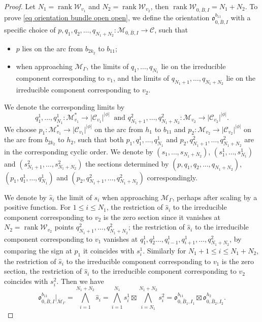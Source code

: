 \documentclass[11pt,a4paper]{article}
\theoremstyle{definition}
\theoremstyle{remark}
\numberwithin{equation}{section}
\def\Mbar{{\overline{\mathcal M}}}
\begin{document}
\begin{proof}
    
    Let $N_1=\operatorname{rank} \mathcal W_{v_1}$ and $N_2=\operatorname{rank} \mathcal W_{v_2}$, then $\operatorname{rank} \mathcal W_{0,\bar{B},I}=N_1+N_2$. To prove \eqref{eq orientation bundle open open}, we define the orientation $\mathfrak{o}^{b_{11}}_{0,\bar B,I}$ with a specific choice of $p,q_1,q_2,\dots,q_{N_1+N_2}\colon \mathcal M_{0,\bar B,I}\to \mathcal C$, such that 
    \begin{itemize}
        \item $p$ lies on the arc from $b_{2k_2}$ to $b_{11}$;
        \item when approaching $\mathcal M_\Gamma$, the limits of $q_1,\dots,q_{N_1}$ lie on the irreducible component corresponding to $v_1$, and  the limits of $q_{N_1+1},\dots,q_{N_1+N_2}$ lie on the irreducible component corresponding to $v_2$.
    \end{itemize}  
    We denote the corresponding limits by \[q^1_1,\dots,q^1_{N_1}\colon \mathcal M^*_{v_1} \to \lvert \mathcal C_{v_1} \rvert^{\lvert \phi\rvert}~\text{ and  }q^2_{N_1+1},\dots,q^2_{N_1+N_2}\colon \mathcal M_{v_2} \to \lvert \mathcal C_{v_2} \rvert^{\lvert \phi\rvert}.\] We choose $p_1\colon \mathcal M^*_{v_1} \to \lvert \mathcal C_{v_1} \rvert^{\lvert \phi\rvert}$ on the arc from $h_1$ to $b_{11}$ and $p_2\colon \mathcal M_{v_2} \to \lvert \mathcal C_{v_2} \rvert^{\lvert \phi\rvert}$ on the arc from $b_{2k_2}$ to $h_2$, such that both $p_1,q^1_1,\dots,q^1_{N_1}$ and $p_2,q^2_{N_1+1},\dots,q^2_{N_1+N_2}$ are in the corresponding cyclic order. We denote by $(s_1,\dots,s_{N_1+N_2})$, $(s^1_1,\dots,s^1_{N_1})$ and $(s^2_{N_1+1},\dots,s^2_{N_1+N_2})$ the sections determined by $(p,q_1,q_2,\dots,q_{N_1+N_2})$, $(p_1,q^1_1,\dots,q^1_{N_1})$ and $(p_2,q^2_{N_1+1},\dots,q^2_{N_1+N_2})$ correspondingly. 

   
    We denote by $\hat s_i$ the limit of $s_i$ when approaching $\mathcal M_\Gamma$,  perhaps after scaling by a positive function. For $1\le i \le N_1$, the restriction of $\hat s_i$ to the irreducible component corresponding to $v_2$ is the zero section since it vanishes at $N_2=\operatorname{rank} \mathcal W_{v_2}$ points $q^2_{N_1+1},\dots, q^2_{N_1+N_2}$;  the restriction of $\hat s_i$ to the irreducible component corresponding to $v_1$ vanishes at $q^1_1,q^1_2\dots, q^1_{i-1},q^1_{i+1},\dots,q^2_{N_1+N_2}$, by comparing the sign at $p_1$ it coincides with $s^1_i$. 
    Similarly for $N_1+1\le i \le N_1+N_2$, the restriction of $\hat s_i$ to the irreducible component corresponding to $v_1$ is the zero section, the restriction of $\hat s_i$ to the irreducible component corresponding to $v_2$ coincides with $s^2_i$.
    Then we have
    $$
    {\mathfrak{o}}^{b_{11}}_{0,\bar B,I}\big |_{\Mbar_\Gamma^{}}=
         \bigwedge_{i=1}^{N_1+N_2}\hat s_i  =\bigwedge_{i=1}^{N_1} s^1_i \boxtimes \bigwedge_{i=N_1}^{N_1+N_2} s^2_i={\mathfrak{o}}^{b_{11}}_{0,\bar B_1,I_1}\boxtimes{\mathfrak{o}}^{h_2}_{0,\bar B_2,I_2}.
    $$

\end{proof}
\end{document}
